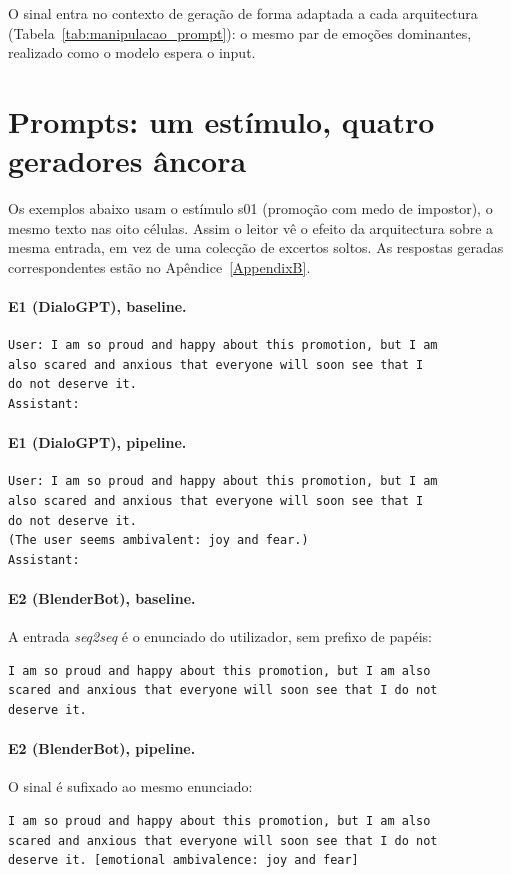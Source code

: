 O sinal entra no contexto de geração de forma adaptada a cada arquitectura (Tabela~\ref{tab:manipulacao_prompt}): o mesmo par de emoções dominantes, realizado como o modelo espera o input.


\section{Prompts: um estímulo, quatro geradores âncora}
\label{sec:impl_prompts}

Os exemplos abaixo usam o estímulo s01 (promoção com medo de impostor), o mesmo texto nas oito células. Assim o leitor vê o efeito da arquitectura sobre a mesma entrada, em vez de uma colecção de excertos soltos. As respostas geradas correspondentes estão no Apêndice~\ref{AppendixB}.

\paragraph{E1 (DialoGPT), baseline.}
\begin{verbatim}
User: I am so proud and happy about this promotion, but I am
also scared and anxious that everyone will soon see that I
do not deserve it.
Assistant:
\end{verbatim}

\paragraph{E1 (DialoGPT), pipeline.}
\begin{verbatim}
User: I am so proud and happy about this promotion, but I am
also scared and anxious that everyone will soon see that I
do not deserve it.
(The user seems ambivalent: joy and fear.)
Assistant:
\end{verbatim}

\paragraph{E2 (BlenderBot), baseline.}
A entrada \textit{seq2seq} é o enunciado do utilizador, sem prefixo de papéis:
\begin{verbatim}
I am so proud and happy about this promotion, but I am also
scared and anxious that everyone will soon see that I do not
deserve it.
\end{verbatim}

\paragraph{E2 (BlenderBot), pipeline.}
O sinal é sufixado ao mesmo enunciado:
\begin{verbatim}
I am so proud and happy about this promotion, but I am also
scared and anxious that everyone will soon see that I do not
deserve it. [emotional ambivalence: joy and fear]
\end{verbatim}

